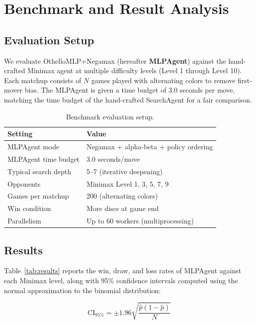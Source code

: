 \section{Benchmark and Result Analysis}

\subsection{Evaluation Setup}

We evaluate OthelloMLP+Negamax (hereafter \textbf{MLPAgent}) against the hand-crafted Minimax agent at multiple difficulty levels (Level 1 through Level 10). Each matchup consists of $N$ games played with alternating colors to remove first-mover bias. The MLPAgent is given a time budget of 3.0 seconds per move, matching the time budget of the hand-crafted SearchAgent for a fair comparison.

\begin{table}[H]
    \centering
    \caption{Benchmark evaluation setup.}
    \begin{tabular}{ll}
        \toprule
        \textbf{Setting} & \textbf{Value} \\
        \midrule
        MLPAgent mode          & Negamax + alpha-beta + policy ordering \\
        MLPAgent time budget   & 3.0 seconds/move \\
        Typical search depth   & 5--7 (iterative deepening) \\
        Opponents              & Minimax Level 1, 3, 5, 7, 9 \\
        Games per matchup      & 200 (alternating colors) \\
        Win condition          & More discs at game end \\
        Parallelism            & Up to 60 workers (multiprocessing) \\
        \bottomrule
    \end{tabular}
\end{table}

\subsection{Results}

Table~\ref{tab:results} reports the win, draw, and loss rates of MLPAgent against each Minimax level, along with 95\% confidence intervals computed using the normal approximation to the binomial distribution:

\begin{equation}
    \text{CI}_{95\%} = \pm 1.96 \sqrt{\frac{\hat{p}(1-\hat{p})}{N}}
\end{equation}

